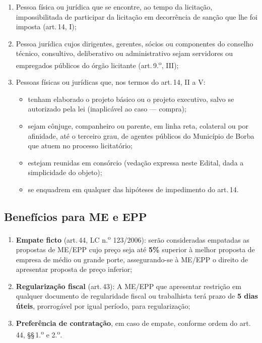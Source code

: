 \documentclass[12pt,a4paper]{article}
\newcommand{\art}[1]{art.\,#1}
\begin{document}
\begin{enumerate}
  \item Pessoa física ou jurídica que se encontre, ao tempo da licitação, impossibilitada
    de participar da licitação em decorrência de sanção que lhe foi imposta
    (\art{14}, I);
  \item Pessoa jurídica cujos dirigentes, gerentes, sócios ou componentes do conselho
    técnico, consultivo, deliberativo ou administrativo sejam servidores ou empregados
    públicos do órgão licitante (\art{9.\textsuperscript{o}}, III);
  \item Pessoas físicas ou jurídicas que, nos termos do \art{14}, II a V:
    \begin{itemize}
      \item tenham elaborado o projeto básico ou o projeto executivo, salvo se
        autorizado pela lei (inaplicável ao caso --- compra);
      \item sejam cônjuge, companheiro ou parente, em linha reta, colateral ou por
        afinidade, até o terceiro grau, de agentes públicos do Município de Borba
        que atuem no processo licitatório;
      \item estejam reunidas em consórcio (vedação expressa neste Edital, dada a
        simplicidade do objeto);
      \item se enquadrem em qualquer das hipóteses de impedimento do \art{14}.
    \end{itemize}
\end{enumerate}

\subsection{Benefícios para ME e EPP}

\begin{enumerate}
  \item \textbf{Empate ficto} (\art{44}, LC n.\textsuperscript{o} 123/2006): serão
    consideradas empatadas as propostas de ME/EPP cujo preço seja até \textbf{5\%}
    superior à melhor proposta de empresa de médio ou grande porte, assegurando-se
    à ME/EPP o direito de apresentar proposta de preço inferior;

  \item \textbf{Regularização fiscal} (\art{43}): A ME/EPP que apresentar restrição
    em qualquer documento de regularidade fiscal ou trabalhista terá prazo de
    \textbf{5 dias úteis}, prorrogável por igual período, para regularização;

  \item \textbf{Preferência de contratação}, em caso de empate, conforme ordem do
    \art{44}, \S\S\,1.\textsuperscript{o} e 2.\textsuperscript{o}.
\end{enumerate}
\end{document}
